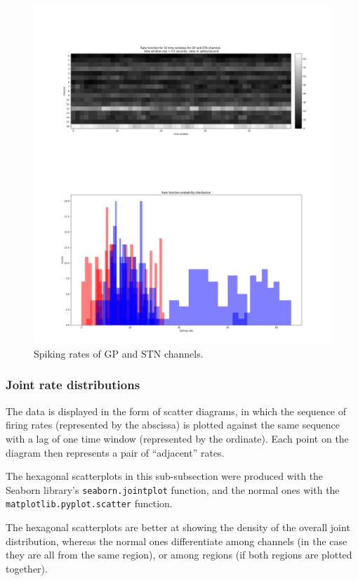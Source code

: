 \documentclass{article}
\begin{document}
\begin{figure}[H]
    \centering
    \centerline{\includegraphics[width=1\textwidth]{images/spiking/SR_all.png}}
    \caption{Spiking rates of GP and STN channels.}
    \label{fig:ratesBoth1}
\end{figure}

\subsubsection{Joint rate distributions}

The data is displayed in the form of scatter diagrams, in which the sequence of firing rates (represented by the abscissa) is plotted against the same sequence with a lag of one time window (represented by the ordinate). 
Each point on the diagram then represents a pair of “adjacent” rates.

The hexagonal scatterplots in this sub-subsection were produced with the Seaborn library's \texttt{seaborn.jointplot} \citep{Seaborn} function, and the normal ones with the \texttt{matplotlib.pyplot.scatter} function.

The hexagonal scatterplots are better at showing the density of the overall joint distribution, whereas the normal ones differentiate among channels (in the case they are all from the same region), or among regions (if both regions are plotted together).
\end{document}
